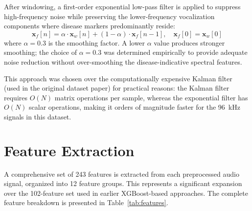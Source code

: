 \documentclass[12pt,a4paper]{report}
\begin{document}
After windowing, a first-order exponential low-pass filter is applied to suppress high-frequency noise while preserving the lower-frequency vocalization components where disease markers predominantly reside:
\begin{equation}
    \mathbf{x}_f[n] = \alpha \cdot \mathbf{x}_w[n] + (1 - \alpha) \cdot \mathbf{x}_f[n-1], \quad \mathbf{x}_f[0] = \mathbf{x}_w[0]
\label{eq:lowpass}
\end{equation}
where $\alpha = 0.3$ is the smoothing factor. A lower $\alpha$ value produces stronger smoothing; the choice of $\alpha = 0.3$ was determined empirically to provide adequate noise reduction without over-smoothing the disease-indicative spectral features.

This approach was chosen over the computationally expensive Kalman filter (used in the original dataset paper) for practical reasons: the Kalman filter requires $O(N)$ matrix operations per sample, whereas the exponential filter has $O(N)$ scalar operations, making it orders of magnitude faster for the 96~kHz signals in this dataset.


\section{Feature Extraction}
\label{sec:feature_extraction}

A comprehensive set of 243 features is extracted from each preprocessed audio signal, organized into 12 feature groups. This represents a significant expansion over the 102-feature set used in earlier XGBoost-based approaches. The complete feature breakdown is presented in Table~\ref{tab:features}.
\end{document}

